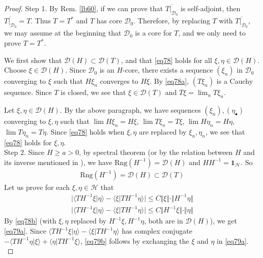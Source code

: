 \documentclass[12pt,b5paper,notitlepage]{article}
\theoremstyle{definition}
\theoremstyle{plain}
\newcommand{\mc}{\mathcal}
\newcommand{\ovl}{\overline}
\newcommand{\idt}{\mathbf{1}}
\newcommand{\Dom}{\scr{D}}
\newcommand{\bk}[1]{\langle {#1}\rangle}
\newcommand{\scr}{\mathscr}
\newcommand{\blt}{\bullet}
\newcommand{\Rng}{\mathrm{Rng}}
\numberwithin{equation}{section}
\begin{document}
\begin{proof}
Step 1. By Rem. \ref{lb60}, if we can prove that $\ovl{T|_{\Dom_0}}$ is self-adjoint, then $\ovl{T|_{\Dom_0}}=T$. Thus $T=T^*$ and $T$ has core $\Dom_0$. Therefore, by replacing $T$ with $\ovl{T|_{\Dom_0}}$, we may assume at the beginning that $\Dom_0$ is a core for $T$, and we only need to prove $T=T^*$. 

We first show that $\Dom(H)\subset\Dom(T)$, and that \eqref{eq78} holds for all $\xi,\eta\in\Dom(H)$. Choose $\xi\in\Dom(H)$. Since $\Dom_0$ is an $H$-core, there exists a sequence $(\xi_n)$ in $\Dom_0$ converging to $\xi$ such that $H\xi_n$  converges to $H\xi$. By \eqref{eq78a}, $(T\xi_n)$ is a Cauchy sequence. Since $T$ is closed, we see that $\xi\in \Dom(T)$ and $T\xi=\lim_n T\xi_n$. 

Let $\xi,\eta\in\Dom(H)$. By the above paragraph, we have sequences $(\xi_n),(\eta_\blt)$ converging to $\xi,\eta$ such that $\lim H\xi_n=H\xi$, $\lim T\xi_n=T\xi$, $\lim H\eta_n=H\eta$, $\lim T\eta_n=T\eta$. Since \eqref{eq78} holds when $\xi,\eta$ are replaced by $\xi_n,\eta_n$,  we see that \eqref{eq78} holds for $\xi,\eta$.\\[-1ex] 

Step 2. Since $H\geq a>0$, by spectral theorem (or by the relation between $H$ and its inverse mentioned in \cite[Sec. 4]{Gui-S}), we have $\Rng(H^{-1})=\Dom(H)$ and $HH^{-1}=\idt_{\mc H}$. So
\begin{align*}
\Rng(H^{-1})=\Dom(H)\subset\Dom(T)
\end{align*}
Let us prove for each $\xi,\eta\in\mc H$ that
\begin{subequations}\label{eq79}
\begin{gather}
\big|\bk{TH^{-1}\xi|\eta}-\bk{\xi|TH^{-1}\eta} \big|\leq C\Vert\xi\Vert\cdot \Vert H^{-1}\eta\Vert\label{eq79a}\\
\big|\bk{TH^{-1}\xi|\eta}-\bk{\xi|TH^{-1}\eta} \big|\leq C\Vert H^{-1}\xi\Vert\cdot \Vert \eta\Vert\label{eq79b}
\end{gather}
\end{subequations}
By \eqref{eq78b} (with $\xi,\eta$ replaced by $H^{-1}\xi,H^{-1}\eta$, both are in $\Dom(H)$), we get \eqref{eq79a}. Since $\bk{TH^{-1}\xi|\eta}-\bk{\xi|TH^{-1}\eta}$ has complex conjugate $-\bk{TH^{-1}\eta|\xi}+\bk{\eta|TH^{-1}\xi}$, \eqref{eq79b} follows by exchanging the $\xi$ and $\eta$ in \eqref{eq79a}.\\[-1ex]


\end{proof}
\end{document}
